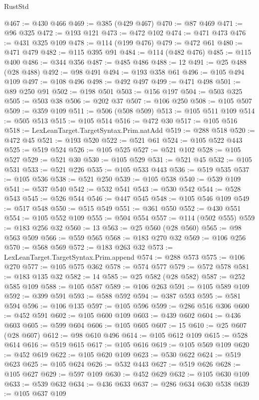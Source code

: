 \begin{lexlean}{RustStd}
\begin{coremodule}
@467 := @430 @466
@469 := @385 (@429 @467)
@470 := @87 @469
@471 := @96 @325
@472 := @193 @121
@473 := @472 @102
@474 := @471 @473
@476 := @431 @325 @109
@478 := @114 (@199 @476)
@479 := @472 @61
@480 := @471 @479
@482 := @115 @395 @91
@484 := @114 (@482 @476)
@485 := @115 @400
@486 := @344 @356
@487 := @485 @486
@488 := 12
@491 := @25 @488 (@28 @488)
@492 := @98 @491
@494 := @193 @358 @61
@496 := @105 @494 @109
@497 := @108 @496
@498 := @492 @497
@499 := @471 @498
@501 := @89 @250 @91
@502 := @198 @501
@503 := @156 @197
@504 := @503 @325
@505 := @503 @38
@506 := @202 @37
@507 := @106 @250
@508 := @105 @507
@509 := @359 @109
@511 := @506 (@508 @509)
@513 := @105 @511 @109
@514 := @505 @513
@515 := @105 @514
@516 := @472 @30
@517 := @105 @516
@518 := LexLeanTarget.TargetSyntax.Prim.natAdd
@519 := @288 @518
@520 := @472 @45
@521 := @193 @520
@522 := @521 @61
@524 := @105 @522 @443
@525 := @519 @524
@526 := @105 @525
@527 := @521 @102
@528 := @105 @527
@529 := @521 @30
@530 := @105 @529
@531 := @521 @45
@532 := @105 @531
@533 := @521 @226
@535 := @105 @533 @443
@536 := @519 @535
@537 := @105 @536
@538 := @521 @250
@539 := @105 @538
@540 := @539 @109
@541 := @537 @540
@542 := @532 @541
@543 := @530 @542
@544 := @528 @543
@545 := @526 @544
@546 := @447 @545
@548 := @105 @546 @109
@549 := @517 @548
@550 := @515 @549
@551 := @361 @550
@552 := @430 @551
@554 := @105 @552 @109
@555 := @504 @554
@557 := @114 (@502 @555)
@559 := @183 @256 @32
@560 := 13
@563 := @25 @560 (@28 @560)
@565 := @98 @563 @509
@566 := @559 @565
@568 := @183 @270 @32
@569 := @106 @256
@570 := @568 @569
@572 := @183 @263 @32
@573 := LexLeanTarget.TargetSyntax.Prim.append
@574 := @288 @573
@575 := @106 @270
@577 := @105 @575 @362
@578 := @574 @577
@579 := @572 @578
@581 := @183 @135 @32
@582 := 14
@585 := @25 @582 (@28 @582)
@587 := @252 @585 @109
@588 := @105 @587
@589 := @106 @263
@591 := @105 @589 @109
@592 := @399 @591
@593 := @588 @592
@594 := @387 @593
@595 := @581 @594
@596 := @106 @135
@597 := @105 @596
@599 := @286 @516 @306
@600 := @452 @591
@602 := @105 @600 @109
@603 := @439 @602
@604 := @436 @603
@605 := @599 @604
@606 := @105 @605
@607 := 15
@610 := @25 @607 (@28 @607)
@612 := @98 @610 @496
@614 := @105 @612 @109
@615 := @528 @614
@616 := @519 @615
@617 := @105 @616
@619 := @105 @569 @109
@620 := @452 @619
@622 := @105 @620 @109
@623 := @530 @622
@624 := @519 @623
@625 := @105 @624
@626 := @532 @443
@627 := @519 @626
@628 := @105 @627
@629 := @597 @109
@630 := @452 @629
@632 := @105 @630 @109
@633 := @539 @632
@634 := @436 @633
@637 := @286 @634 @630 @538
@639 := @105 @637 @109

\end{coremodule}
\end{lexlean}
